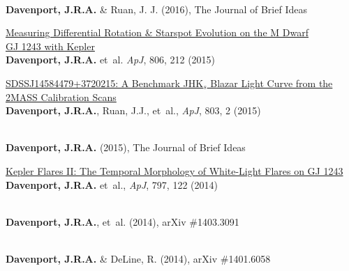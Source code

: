 \documentclass{article}
\begin{document}
\begin{llist}
\begin{etaremune}[leftmargin=10pt]
\item\href{http://dx.doi.org/10.5281/zenodo.60308}{\color{NavyBlue}{\sc Searching for ``Tabby's Star'' Analogs in Stripe 82}}\\
{\bf Davenport, J.R.A.} \& Ruan, J. J. (2016), The Journal of Brief Ideas


\item{\sc \href{http://arxiv.org/abs/1505.01524}{\color{NavyBlue} Measuring Differential Rotation \& Starspot Evolution on the M Dwarf \\GJ 1243 with Kepler}}\\
{\bf Davenport, J.R.A.} et~al. {\em ApJ}, 806, 212 (2015)

\item{\sc \href{http://adsabs.harvard.edu/abs/2015ApJ...803....2D}{\color{NavyBlue}SDSSJ14584479+3720215: A Benchmark JHK$_s$ Blazar Light Curve from the\\ 2MASS Calibration Scans}}\\
{\bf Davenport, J.R.A.}, Ruan, J.J., et~al., {\em ApJ}, 803, 2 (2015)

\item\href{http://dx.doi.org/10.5281/zenodo.14841}{\color{NavyBlue}{\sc The Galactic Astigmatism: Constraining the Milky Way Dark Matter Halo\\ Using Ultra-Weak Lensing}}\\
{\bf Davenport, J.R.A.} (2015), The Journal of Brief Ideas


\item{\sc \href{http://adsabs.harvard.edu/abs/2014ApJ...797..122D}{\color{NavyBlue}Kepler Flares II: The Temporal Morphology of White-Light Flares on GJ 1243}}\\
{\bf Davenport, J.R.A.} et~al.,  {\em ApJ}, 797, 122 (2014)

\item\href{http://arxiv.org/abs/1403.3091}{\color{NavyBlue}{\sc Studying Gender in Conference Talks -- data from the 223rd meeting of the\\ American Astronomical Society}}\\
{\bf Davenport, J.R.A.}, et~al.  (2014), arXiv \#1403.3091


\item\href{http://arxiv.org/abs/1401.6058}{\color{NavyBlue}{\sc The Readability of Tweets and their Geographic Correlation with Education}}\\
{\bf Davenport, J.R.A.} \& DeLine, R. (2014), arXiv \#1401.6058



\end{etaremune}
\end{llist}
\end{document}
